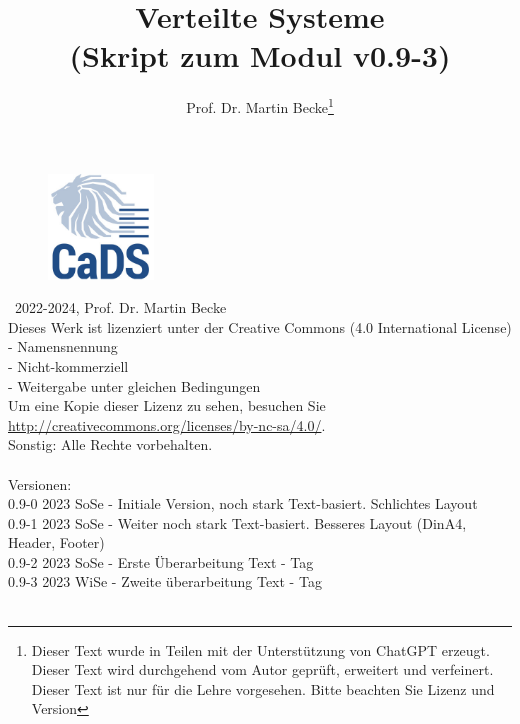 \documentclass[a4paper]{article}
\title{Verteilte Systeme\\ (Skript zum Modul v0.9-3)}
\author{Prof. Dr. Martin Becke\footnote{Dieser Text wurde in Teilen mit der Unterstützung von ChatGPT erzeugt. Dieser Text{} wird durchgehend vom Autor geprüft, erweitert und verfeinert. Dieser Text ist nur für die Lehre vorgesehen. Bitte beachten Sie Lizenz und Version}}
\begin{document}
\maketitle
\vspace*{\fill} %
\begin{figure}[h]
  \centering
  \includegraphics[width=0.25\textwidth]{fig/graphics/CADS_Logo_Quadrat_300x300_RGB_72dpi.jpg} %
\end{figure}
\vspace*{\fill}

\newpage

\noindent
\textcopyright\ 2022-2024, Prof. Dr. Martin Becke\\
Dieses Werk ist lizenziert unter der Creative Commons (4.0 International License)\\
- Namensnennung\\ - Nicht-kommerziell\\ - Weitergabe unter gleichen Bedingungen \\Um eine Kopie dieser Lizenz zu sehen, besuchen Sie\\ \url{http://creativecommons.org/licenses/by-nc-sa/4.0/}.\\
Sonstig: Alle Rechte vorbehalten.
\noindent
\\\\
Versionen:\\
0.9-0 2023 SoSe - Initiale Version, noch stark Text-basiert. Schlichtes Layout\\
0.9-1 2023 SoSe - Weiter noch stark Text-basiert. Besseres Layout (DinA4, Header, Footer)\\ 
0.9-2 2023 SoSe - Erste Überarbeitung Text - Tag
\\
0.9-3 2023 WiSe - Zweite überarbeitung Text - Tag
\\\\

\end{document}
